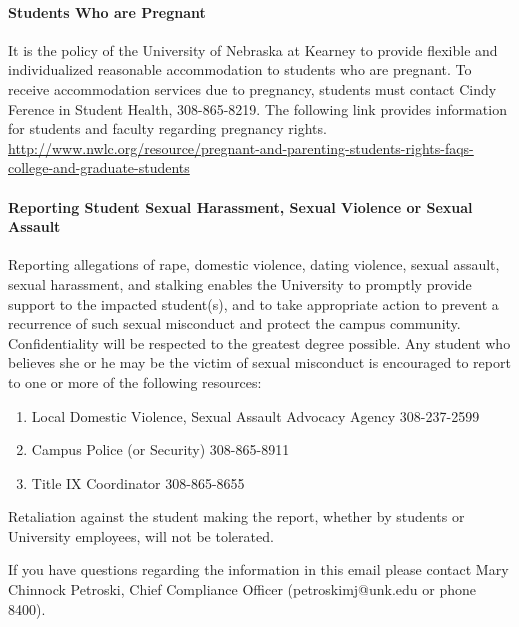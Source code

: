 \documentclass[12pt]{article}
\newcounter{ex}\setcounter{ex}{0}
\begin{document}
\paragraph{Students Who are Pregnant} It is the policy of the University of Nebraska at Kearney to provide flexible and individualized reasonable accommodation to students who are pregnant. To receive accommodation services due to pregnancy, students must contact Cindy Ference in Student Health, 308-865-8219. The following link provides information for students and faculty regarding pregnancy rights. \url{http://www.nwlc.org/resource/pregnant-and-parenting-students-rights-faqs-college-and-graduate-students}



\paragraph{Reporting Student Sexual Harassment, Sexual Violence or Sexual Assault} Reporting allegations of rape, domestic violence, dating violence, sexual assault, sexual harassment, and stalking enables the University to promptly provide support to the impacted student(s), and to take appropriate action to prevent a recurrence of such sexual misconduct and protect the campus community. Confidentiality will be respected to the greatest degree possible. Any student who believes she or he may be the victim of sexual misconduct is encouraged to report to one or more of the following resources:

\begin{enumerate}

\item Local Domestic Violence, Sexual Assault Advocacy Agency 308-237-2599

\item Campus Police (or Security) 308-865-8911

\item Title IX  Coordinator 308-865-8655

\end{enumerate}
Retaliation against the student making the report, whether by students or University employees, will not be tolerated.


If you have questions regarding the information in this email please contact Mary Chinnock Petroski, Chief Compliance Officer (petroskimj@unk.edu or phone 8400).
\end{document}
